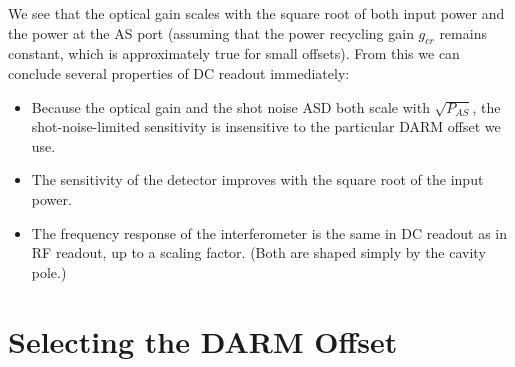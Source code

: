 We see that the optical gain scales with the square root of both input
power and the power at the AS port (assuming that the power recycling
gain $g_{cr}$ remains constant, which is approximately true for small
offsets).  From this we can conclude several properties of DC readout
immediately:
%
\begin{itemize}
\item Because the optical gain and the shot noise ASD both scale with
  $\sqrt{P_{AS}}$, the shot-noise-limited sensitivity is insensitive to the
  particular DARM offset we use.
\item The sensitivity of the detector improves with the square root of
  the input power.
\item The frequency response of the interferometer is the same in DC
  readout as in RF readout, up to a scaling factor. (Both are shaped
  simply by the cavity pole.)
\end{itemize}

\section{Selecting the DARM Offset}

